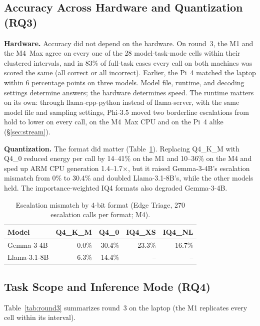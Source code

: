 \documentclass[conference]{IEEEtran}
\begin{document}
\subsection{Accuracy Across Hardware and Quantization (RQ3)}
\label{sec:accuracy}

\textbf{Hardware.} Accuracy did not depend on the hardware. On round~3, the M1 and the M4~Max agree on every one of the 28 model-task-mode cells within their clustered intervals, and in 83\% of full-task cases every call on both machines was scored the same (all correct or all incorrect). Earlier, the Pi~4 matched the laptop within 6 percentage points on three models. Model file, runtime, and decoding settings determine answers; the hardware determines speed. The runtime matters on its own: through llama-cpp-python instead of llama-server, with the same model file and sampling settings, Phi-3.5 moved two borderline escalations from hold to lower on every call, on the M4~Max CPU and on the Pi~4 alike (\S\ref{sec:stream}).

\textbf{Quantization.} The format did matter (Table~\ref{tab:quant}). Replacing Q4\_K\_M with Q4\_0 reduced energy per call by 14--41\% on the M1 and 10--36\% on the M4 and sped up ARM CPU generation 1.4--1.7$\times$, but it raised Gemma-3-4B's escalation mismatch from 0\% to 30.4\% and doubled Llama-3.1-8B's, while the other models held. The importance-weighted IQ4 formats also degraded Gemma-3-4B.

\begin{table}[t]
\caption{Escalation mismatch by 4-bit format (Edge Triage, 270 escalation calls per format; M4).}
\label{tab:quant}
\centering
\small
\begin{tabular}{@{}lrrrr@{}}
\toprule
Model & Q4\_K\_M & Q4\_0 & IQ4\_XS & IQ4\_NL \\
\midrule
Gemma-3-4B & 0.0\% & 30.4\% & 23.3\% & 16.7\% \\
Llama-3.1-8B & 6.3\% & 14.4\% & -- & -- \\
\bottomrule
\end{tabular}
\end{table}

\subsection{Task Scope and Inference Mode (RQ4)}
\label{sec:round3}

Table~\ref{tab:round3} summarizes round~3 on the laptop (the M1 replicates every cell within its interval).
\end{document}
